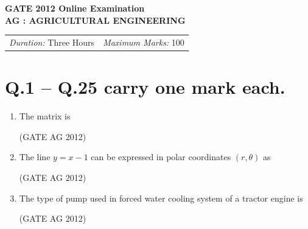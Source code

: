 \documentclass[journal]{IEEEtran}
\begin{document}
\begin{center}
    \textbf{GATE 2012 Online Examination} \\[0.3em]
    \textbf{AG : AGRICULTURAL ENGINEERING} \\[1em]
    \begin{tabular}{l@{\qquad}r}
        \textit{Duration:} Three Hours & \textit{Maximum Marks:} 100
    \end{tabular}
\end{center}


\section*{Q.1 -- Q.25 carry one mark each.}

\begin{enumerate}
\item
The matrix 
is 
\begin{enumerate}
\end{enumerate}
\hfill(GATE AG 2012)\\

\medskip

\item
The line $y = x-1$ can be expressed in polar coordinates $(r, \theta)$ as
\begin{enumerate}
\end{enumerate}
\hfill(GATE AG 2012)\\

\medskip

\item
The type of pump used in forced water cooling system of a tractor engine is
\begin{enumerate}
\end{enumerate}
\hfill(GATE AG 2012)\\


\end{enumerate}
\end{document}

